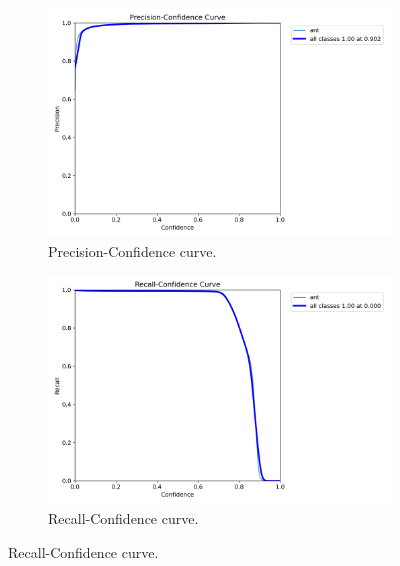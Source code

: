 \begin{figure}[!p]
	\centering
	\begin{subfigure}[]{0.45\textwidth}
        \centering
		\includegraphics[width=\textwidth]{figures/06_results/PrecisionCurveDetector.png}
        \caption[Precision-Confidence curve of YOLOv8]{\footnotesize{Precision-Confidence curve.}}
        \label{fig:detector_precision}
	\end{subfigure}
	\begin{subfigure}[]{0.45\textwidth}
        \centering
		\includegraphics[width=\textwidth]{figures/06_results/RecallCurveDetector.png}
        \caption[Recall-Confidence curve of YOLOv8]{\footnotesize{Recall-Confidence curve.}}
        \label{fig:detector_recall}
	\end{subfigure}


\end{figure}
